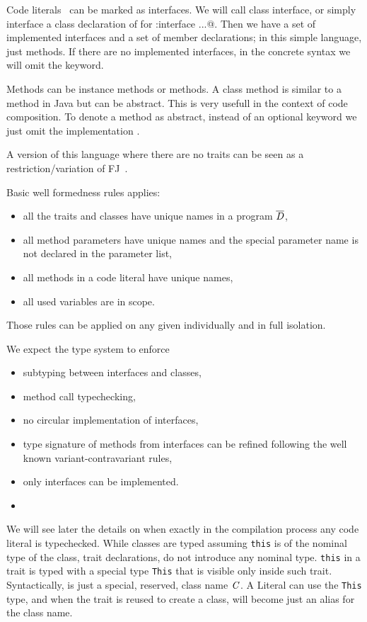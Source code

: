 Code literals \mL\ can be marked as interfaces.  We will call class
interface, or simply interface a class declaration of for \Q@C:{interface  ...}@.
  Then we have a set of implemented interfaces and a set of member declarations; in this simple language, just methods.
If there are no implemented interfaces, in the concrete syntax we will omit the \Q@implements@ keyword.

Methods \mMD can be instance methods or \Q@class@ methods. A class method is similar to a \Q@static@ method in Java but can be abstract. This is very usefull in the context of code composition.
To denote a method as abstract, instead of an optional keyword we just omit the implementation \me.

A version of this language where there are no traits can be seen 
as a restriction/variation of FJ~\cite{}.

Basic well formedness rules applies:
\begin{itemize}
\item all the traits and classes have unique names in a program $\overline{\mathit{D}}$,
\item all method parameters have unique names and the special parameter name \Q@this@ is not declared
 in the parameter list,
\item all methods in a code literal have unique names,
\item all used variables are in scope.
\end{itemize}
Those rules can be applied on any given \mL individually and in full isolation.

We expect the type system to enforce 
\begin{itemize}
\item subtyping between interfaces and classes,
\item method call typechecking,
\item no circular implementation of interfaces,
\item type signature of methods from interfaces can be refined following the well known variant-contravariant rules,
\item only interfaces can be implemented.
\item {}
\end{itemize}
We will see later the details on when exactly in the compilation process any code literal is typechecked.
While classes are typed assuming \lstinline{this} is of the nominal type of the
class, trait declarations, do not introduce any nominal type.  \lstinline{this}
in a trait is typed with a special type \lstinline{This} that is visible only
inside such trait. Syntactically, \Q@This@ is just a special, reserved, class name $\mathit{C}$.
A Literal can use the \lstinline{This} type,
and when the trait is reused to create a class, \Q@This@ will become just
an alias for the class name.

